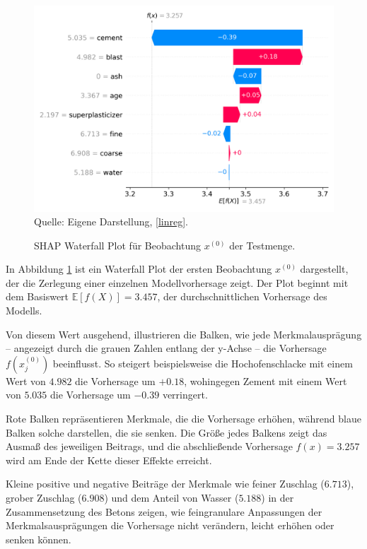 \begin{figure}[!h]
    \caption{SHAP Waterfall Plot für Beobachtung $x^{(0)}$ der Testmenge.}
    \includegraphics[width=1\textwidth]{../scripts/images/shap_waterfall_plot.png}
    Quelle: Eigene Darstellung, \ref{linreg}.
    \label{pic:shap_waterfall}
\end{figure}

In Abbildung \ref{pic:shap_waterfall} ist ein Waterfall Plot der ersten Beobachtung $x^{(0)}$ dargestellt, 
der die Zerlegung einer einzelnen Modellvorhersage zeigt. Der Plot beginnt mit dem Basiswert $\mathbb{E}[f(X)] = 3.457$, 
der durchschnittlichen Vorhersage des Modells. 

Von diesem Wert ausgehend, illustrieren die Balken, wie jede Merkmalausprägung – 
angezeigt durch die grauen Zahlen entlang der y-Achse – die Vorhersage $f(x_{j}^{(0)})$ beeinflusst. 
So steigert beispielsweise die Hochofenschlacke mit einem Wert von $4.982$ die Vorhersage um $+0.18$, 
wohingegen Zement mit einem Wert von $5.035$ die Vorhersage um $-0.39$ verringert.

Rote Balken repräsentieren Merkmale, die die Vorhersage erhöhen, während blaue Balken solche 
darstellen, die sie senken. Die Größe jedes Balkens zeigt das Ausmaß des jeweiligen Beitrags, 
und die abschließende Vorhersage $f(x) = 3.257$ wird am Ende der Kette dieser Effekte erreicht. 

Kleine positive und negative Beiträge der Merkmale wie feiner Zuschlag ($6.713$), grober Zuschlag ($6.908$) und dem Anteil von Wasser ($5.188$) 
in der Zusammensetzung des Betons zeigen, wie feingranulare Anpassungen der Merkmalsausprägungen die Vorhersage nicht verändern, 
leicht erhöhen oder senken können.

